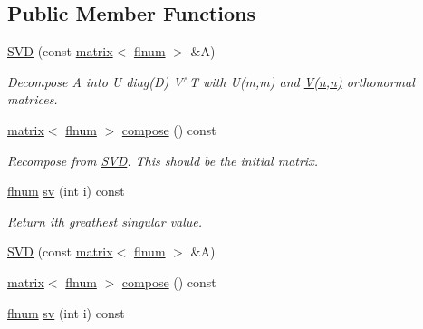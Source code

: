 \subsection*{Public Member Functions}
\begin{DoxyCompactItemize}
\item 
\hyperlink{classlibNumerics_1_1SVD_aa0d6c136b19b0699fe99ae4727864158}{S\+V\+D} (const \hyperlink{classlibNumerics_1_1matrix}{matrix}$<$ \hyperlink{namespacelibNumerics_ac94c07350f743d00e3dbcb33b6e974b0}{flnum} $>$ \&A)
\begin{DoxyCompactList}\small\item\em Decompose A into U diag(\+D) V$^\wedge$\+T with U(m,m) and \hyperlink{jaricom_8c_af20c591dd6cbdf45ad772686aa4b9f30}{V(n,n)} orthonormal matrices. \end{DoxyCompactList}\item 
\hyperlink{classlibNumerics_1_1matrix}{matrix}$<$ \hyperlink{namespacelibNumerics_ac94c07350f743d00e3dbcb33b6e974b0}{flnum} $>$ \hyperlink{classlibNumerics_1_1SVD_a9c51cf9b849a0ca0ebf237449bbf36f7}{compose} () const 
\begin{DoxyCompactList}\small\item\em Recompose from \hyperlink{classlibNumerics_1_1SVD}{S\+V\+D}. This should be the initial matrix. \end{DoxyCompactList}\item 
\hyperlink{namespacelibNumerics_ac94c07350f743d00e3dbcb33b6e974b0}{flnum} \hyperlink{classlibNumerics_1_1SVD_a1c0ed0df84c90c90d42227c4b6df1cae}{sv} (int i) const 
\begin{DoxyCompactList}\small\item\em Return ith greathest singular value. \end{DoxyCompactList}\item 
\hyperlink{classlibNumerics_1_1SVD_aa0d6c136b19b0699fe99ae4727864158}{S\+V\+D} (const \hyperlink{classlibNumerics_1_1matrix}{matrix}$<$ \hyperlink{namespacelibNumerics_ac94c07350f743d00e3dbcb33b6e974b0}{flnum} $>$ \&A)
\item 
\hyperlink{classlibNumerics_1_1matrix}{matrix}$<$ \hyperlink{namespacelibNumerics_ac94c07350f743d00e3dbcb33b6e974b0}{flnum} $>$ \hyperlink{classlibNumerics_1_1SVD_ae64a89da8d4dce887c171d757741318b}{compose} () const 
\item 
\hyperlink{namespacelibNumerics_ac94c07350f743d00e3dbcb33b6e974b0}{flnum} \hyperlink{classlibNumerics_1_1SVD_a1c0ed0df84c90c90d42227c4b6df1cae}{sv} (int i) const 
\end{DoxyCompactItemize}

